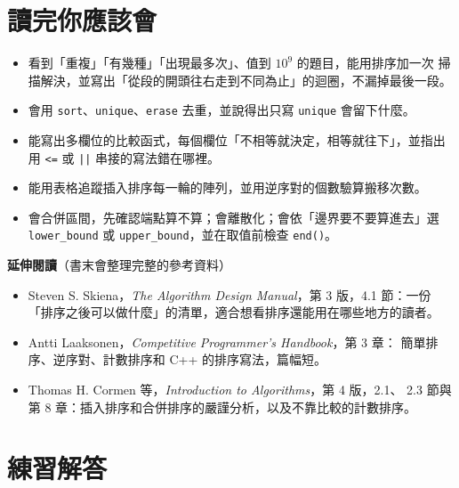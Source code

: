 \section{讀完你應該會}
\label{sec:srt-checklist}

\begin{itemize}
\item 看到「重複」「有幾種」「出現最多次」、值到 $10^9$ 的題目，能用排序加一次
掃描解決，並寫出「從段的開頭往右走到不同為止」的迴圈，不漏掉最後一段。
\item 會用 \texttt{sort}、\texttt{unique}、\texttt{erase} 去重，並說得出只寫
\texttt{unique} 會留下什麼。
\item 能寫出多欄位的比較函式，每個欄位「不相等就決定，相等就往下」，並指出用
\texttt{<=} 或 \texttt{||} 串接的寫法錯在哪裡。
\item 能用表格追蹤插入排序每一輪的陣列，並用逆序對的個數驗算搬移次數。
\item 會合併區間，先確認端點算不算；會離散化；會依「邊界要不要算進去」選
\texttt{lower\_bound} 或 \texttt{upper\_bound}，並在取值前檢查 \texttt{end()}。
\end{itemize}

\textbf{延伸閱讀}（書末會整理完整的參考資料）

\begin{itemize}
\item Steven S. Skiena，\textit{The Algorithm Design Manual}，第 3 版，4.1
節：一份「排序之後可以做什麼」的清單，適合想看排序還能用在哪些地方的讀者。
\item Antti Laaksonen，\textit{Competitive Programmer's Handbook}，第 3 章：
簡單排序、逆序對、計數排序和 C++ 的排序寫法，篇幅短。
\item Thomas H. Cormen 等，\textit{Introduction to Algorithms}，第 4 版，2.1、
2.3 節與第 8 章：插入排序和合併排序的嚴謹分析，以及不靠比較的計數排序。
\end{itemize}

\section*{練習解答}


